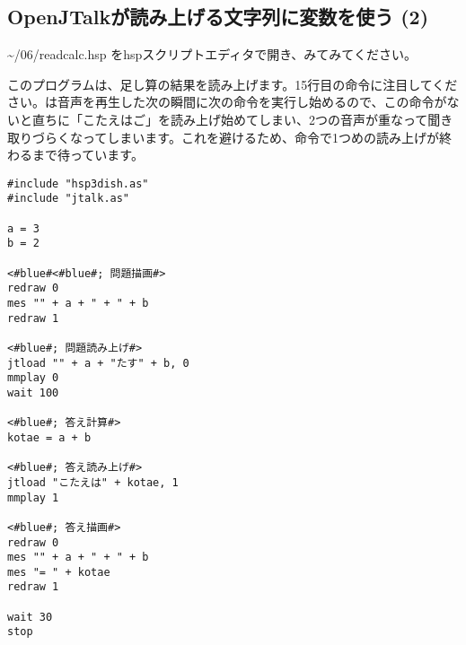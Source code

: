 \subsection{OpenJTalkが読み上げる文字列に変数を使う (2)}
 \textasciitilde /06/readcalc.hsp をhspスクリプトエディタで開き、みてみてください。

このプログラムは、足し算の結果を読み上げます。15行目の命令に注目してください。は音声を再生した次の瞬間に次の命令を実行し始めるので、この命令がないと直ちに「こたえはご」を読み上げ始めてしまい、2つの音声が重なって聞き取りづらくなってしまいます。これを避けるため、命令で1つめの読み上げが終わるまで待っています。\\

\begin{lstlisting}[caption=readcalc.hsp,label=readcalc.hsp]
#include "hsp3dish.as"
#include "jtalk.as"

a = 3
b = 2

<#blue#<#blue#; 問題描画#>
redraw 0
mes "" + a + " + " + b
redraw 1

<#blue#; 問題読み上げ#>
jtload "" + a + "たす" + b, 0
mmplay 0
wait 100

<#blue#; 答え計算#>
kotae = a + b

<#blue#; 答え読み上げ#>
jtload "こたえは" + kotae, 1
mmplay 1

<#blue#; 答え描画#>
redraw 0
mes "" + a + " + " + b
mes "= " + kotae
redraw 1

wait 30
stop
\end{lstlisting}

\begin{tcolorbox}[title=\useOmetoi]
\begin{enumerate}
\end{enumerate}
\end{tcolorbox}
